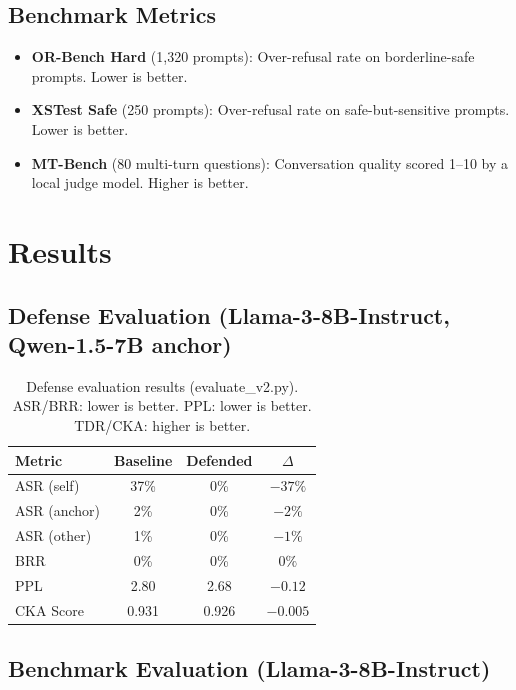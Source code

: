 \documentclass[11pt]{article}
\begin{document}
\subsection{Benchmark Metrics}

\begin{itemize}[noitemsep]
    \item \textbf{OR-Bench Hard} (1,320 prompts): Over-refusal rate on borderline-safe prompts. Lower is better.
    \item \textbf{XSTest Safe} (250 prompts): Over-refusal rate on safe-but-sensitive prompts. Lower is better.
    \item \textbf{MT-Bench} (80 multi-turn questions): Conversation quality scored 1--10 by a local judge model. Higher is better.
\end{itemize}

\section{Results}

\subsection{Defense Evaluation (Llama-3-8B-Instruct, Qwen-1.5-7B anchor)}

\begin{table}[h]
\centering
\caption{Defense evaluation results (evaluate\_v2.py). ASR/BRR: lower is better. PPL: lower is better. TDR/CKA: higher is better.}
\label{tab:defense_results}
\begin{tabular}{@{}lccc@{}}
\toprule
\textbf{Metric} & \textbf{Baseline} & \textbf{Defended} & \textbf{$\Delta$} \\
\midrule
ASR (self)    & 37\% & 0\% & $-37\%$ \\
ASR (anchor)  & 2\%  & 0\% & $-2\%$ \\
ASR (other)   & 1\%  & 0\% & $-1\%$ \\
BRR           & 0\%  & 0\% & $0\%$ \\
PPL           & 2.80 & 2.68 & $-0.12$ \\
CKA Score     & 0.931 & 0.926 & $-0.005$ \\
\bottomrule
\end{tabular}
\end{table}

\subsection{Benchmark Evaluation (Llama-3-8B-Instruct)}
\end{document}
